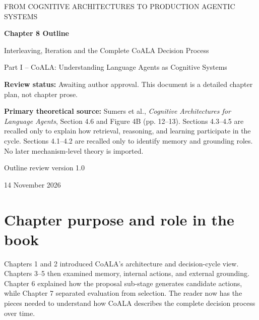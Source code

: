 


\thispagestyle{empty}
\begin{center}
{\sffamily\Large\color{BookBlue} FROM COGNITIVE ARCHITECTURES TO PRODUCTION AGENTIC SYSTEMS\par}
\vspace{1.2cm}
{\sffamily\huge\bfseries\color{BookBlue} Chapter 8 Outline\par}
\vspace{0.45cm}
{\sffamily\LARGE Interleaving, Iteration and the Complete CoALA Decision Process\par}
\vspace{0.8cm}
{\large Part I -- CoALA: Understanding Language Agents as Cognitive Systems\par}
\vfill
\begin{learningbox}
\textbf{Review status:} Awaiting author approval. This document is a detailed chapter plan, not chapter prose.

\textbf{Primary theoretical source:} Sumers et al., \emph{Cognitive Architectures for Language Agents}, Section 4.6 and Figure 4B (pp. 12--13). Sections 4.3--4.5 are recalled only to explain how retrieval, reasoning, and learning participate in the cycle. Sections 4.1--4.2 are recalled only to identify memory and grounding roles. No later mechanism-level theory is imported.
\end{learningbox}
\vfill
{\sffamily\large Outline review version 1.0\par}
{\small 14 November 2026\par}
\end{center}
\clearpage

\setcounter{chapter}{8}
\section{Chapter purpose and role in the book}
Chapters 1 and 2 introduced CoALA's architecture and decision-cycle view. Chapters 3--5 then examined memory, internal actions, and external grounding. Chapter 6 explained how the proposal sub-stage generates candidate actions, while Chapter 7 separated evaluation from selection. The reader now has the pieces needed to understand how CoALA describes the complete decision process over time.

